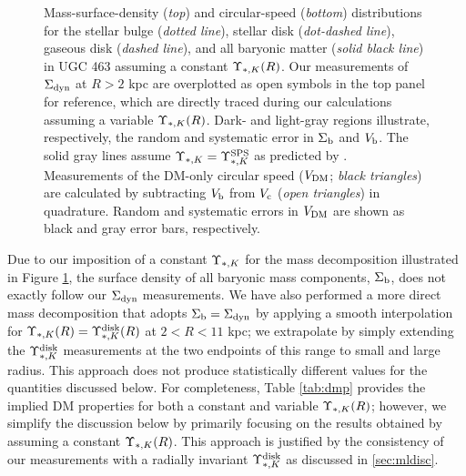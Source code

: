 \documentclass[apj,iop,numberedappendix]{emulateapj}
\begin{document}
\begin{figure}
\caption{
%
Mass-surface-density ({\it top}) and circular-speed ({\it bottom}) distributions
for the stellar bulge ({\it dotted line}), stellar disk ({\it dot-dashed line}),
gaseous disk ({\it dashed line}), and all baryonic matter ({\it solid black
line}) in UGC 463 assuming a constant $\Upsilon_{\ast,K}(R)$.  Our measurements of $\Sigma_{\rm dyn}$
at $R>2$ kpc are overplotted as open symbols in the top panel for reference,
which are directly traced during our calculations assuming a variable $\Upsilon_{\ast,K}(R)$.
Dark- and light-gray regions illustrate, respectively, the random and systematic
error in $\Sigma_{\rm b}$ and $V_{\rm b}$.  The solid gray lines assume $\Upsilon_{\ast,K} = \Upsilon_{\ast,K}^{\rm SPS}$
as predicted by .  Measurements of the DM-only
circular speed ($V_{\rm DM}$; {\it black triangles}) are calculated by subtracting
$V_{\rm b}$ from $V_{\rm c}$ ({\it open triangles}) in quadrature.  Random and systematic
errors in $V_{\rm DM}$ are shown as black and gray error bars, respectively. 
%
}
\label{fig:rcdecomp}
\end{figure}

Due to our imposition of a constant $\Upsilon_{\ast,K}$ for the mass decomposition
illustrated in Figure \ref{fig:rcdecomp}, the surface density of all baryonic
mass components, $\Sigma_{\rm b}$, does not exactly follow our $\Sigma_{\rm dyn}$ measurements.
We have also performed a more direct mass decomposition that adopts $\Sigma_{\rm b} =
\Sigma_{\rm dyn}$ by applying a smooth interpolation for $\Upsilon_{\ast,K}(R) = \Upsilon_{\ast,K}^{\rm disk}(R)$ at
$2<R<11$ kpc; we extrapolate by simply extending the $\Upsilon_{\ast,K}^{\rm disk}$ measurements at
the two endpoints of this range to small and large radius.  This approach does not
produce statistically different values for the quantities discussed below.  For
completeness, Table \ref{tab:dmp} provides the implied DM properties for both a
constant and variable $\Upsilon_{\ast,K}(R)$; however, we simplify the discussion below by
primarily focusing on the results obtained by assuming a constant $\Upsilon_{\ast,K}(R)$.
This approach is justified by the consistency of our measurements with a
radially invariant $\Upsilon_{\ast,K}^{\rm disk}$ as discussed in \sect \ref{sec:mldisc}.
\end{document}

